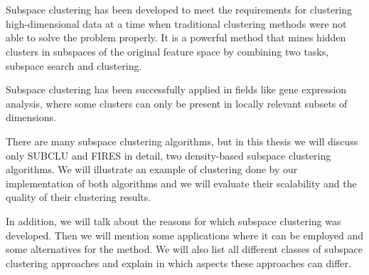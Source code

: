 \section*{}\raggedbottom

Subspace clustering has been developed to meet the requirements for clustering high-dimensional data at a time when traditional clustering methods were not able to solve the problem properly. It is a powerful method that mines hidden clusters in subspaces of the original feature space by combining two tasks, subspace search and clustering.

Subspace clustering has been successfully applied in fields like gene expression analysis, where some clusters can only be present in locally relevant subsets of dimensions.

There are many subspace clustering algorithms, but in this thesis we will discuss only SUBCLU \citep{subclu} and FIRES \citep{fires} in detail, two density-based subspace clustering algorithms. We will illustrate an example of clustering done by our implementation of both algorithms and we will evaluate their scalability and the quality of their clustering results.

In addition, we will talk about the reasons for which subspace clustering was developed. Then we will mention some applications where it can be employed and some alternatives for the method. We will also list all different classes of subspace clustering approaches and explain in which aspects these approaches can differ.